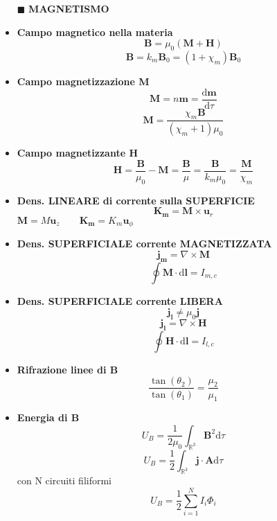 \documentclass{book}
\newcommand{\g}{\textbf}
\newcommand{\h}{\mathbf}
\newcommand{\e}{\begin{equation}}
\newcommand{\ex}{\end{equation} }
\renewcommand{\it}{\item[$\cdot$]}
\begin{document}
\begin{multicols*}{4}
\begin{itemize}
\item [$\blacksquare$] \g{MAGNETISMO}
    \it \g{Campo magnetico nella materia}
        \e{\h{B}=\mu_0(\h{M}+\h{H})} \ex
        \e{\h{B}=k_m\h{B}_0=(1+\chi_m)\h{B}_0} \ex
    \it \g{Campo magnetizzazione M}
        \e{\h{M}=n\h{m}=\frac{\mathrm{d}\h{m}}{\mathrm{d}\tau}} \ex
        \e{\h{M}=\frac{\chi_m \h{B}}{(\chi_m+1)\mu_0}} \ex
    \it \g{Campo magnetizzante H}
        \e{\h{H}=\frac{\h{B}}{\mu_0}-\h{M}=\frac{\h{B}}{\mu}=\frac{\h{B}}{k_m\mu_0}=\frac{\h{M}}{\chi_m}} \ex
    \it \g{Dens. LINEARE di corrente sulla SUPERFICIE}
        \e{\h{K_m}=\h{M}\times\h{u}_r} \ex
        $\h{M}=M\h{u}_z \qquad \h{K_m}=K_m\h{u}_\phi$ \\
    \it \g{Dens. SUPERFICIALE corrente MAGNETIZZATA}
        \e{\h{j_m}=\nabla\times\h{M}} \ex
        \e{\oint\h{M}\cdot\mathrm{d}\h{{l}}=I_{m,c}} \ex
    \it \g{Dens. SUPERFICIALE corrente LIBERA}
        \e{\h{j_l}\neq\mu_0\h{j}} \ex
        \e{\h{j_l}=\nabla\times\h{H}} \ex
        \e{\oint\h{H}\cdot\mathrm{d}\h{l}=I_{l,c}} \ex
    \it \g{Rifrazione linee di B}
        \e{\frac{\tan(\theta_2)}{\tan(\theta_1)}=\frac{\mu_2}{\mu_1}} \ex
    \it \g{Energia di B}
        \e{ U_B=\frac{1}{2 \mu_{0}} \int_{\mathbb{R}^3} \h{B}^{2} \mathrm{d}\tau }\ex
        \e{U_B=\frac{1}{2}\int_{\mathbb{R}^3}\h{j}\cdot\h{A}\mathrm{d}\tau} \ex
        con N circuiti filiformi
        \e{U_B=\frac{1}{2}\sum_{i=1}^N I_i\Phi_i} \ex


\end{itemize}
\end{multicols*}
\end{document}
